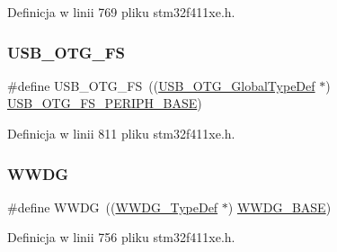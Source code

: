 Definicja w linii 769 pliku stm32f411xe.\+h.

\mbox{\label{group___peripheral__declaration_ga9ebb053ee138fb47cdfede0e3371123d}} 
\subsubsection{\texorpdfstring{U\+S\+B\+\_\+\+O\+T\+G\+\_\+\+FS}{USB\_OTG\_FS}}
{\footnotesize\ttfamily \#define U\+S\+B\+\_\+\+O\+T\+G\+\_\+\+FS~((\hyperlink{struct_u_s_b___o_t_g___global_type_def}{U\+S\+B\+\_\+\+O\+T\+G\+\_\+\+Global\+Type\+Def} $\ast$) \hyperlink{group___peripheral__memory__map_gaa86d4c80849a74938924e73937b904e7}{U\+S\+B\+\_\+\+O\+T\+G\+\_\+\+F\+S\+\_\+\+P\+E\+R\+I\+P\+H\+\_\+\+B\+A\+SE})}



Definicja w linii 811 pliku stm32f411xe.\+h.

\mbox{\label{group___peripheral__declaration_ga9821fd01757986612ddb8982e2fe27f1}} 
\subsubsection{\texorpdfstring{W\+W\+DG}{WWDG}}
{\footnotesize\ttfamily \#define W\+W\+DG~((\hyperlink{struct_w_w_d_g___type_def}{W\+W\+D\+G\+\_\+\+Type\+Def} $\ast$) \hyperlink{group___peripheral__memory__map_ga9a5bf4728ab93dea5b569f5b972cbe62}{W\+W\+D\+G\+\_\+\+B\+A\+SE})}



Definicja w linii 756 pliku stm32f411xe.\+h.


